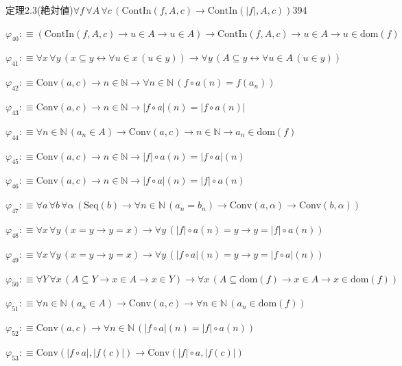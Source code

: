 \begin{fullproof}{定理2.3(絶対値)}{$\forall f\,\forall A\,\forall c\,(\mathrm{ContIn}(f,A,c) \to \mathrm{ContIn}(\lvert f \rvert,A,c))$}{394}
\begin{abbrevlist}
\item $\varphi_{40} :\equiv (\mathrm{ContIn}(f,A,c) \to u \in A \to u \in A) \to \mathrm{ContIn}(f,A,c) \to u \in A \to u \in \mathrm{dom}(f)$
\item $\varphi_{41} :\equiv \forall x\,\forall y\,(x \subseteq y \leftrightarrow \forall u \in x\,(u \in y)) \to \forall y\,(A \subseteq y \leftrightarrow \forall u \in A\,(u \in y))$
\item $\varphi_{42} :\equiv \mathrm{Conv}(a,c) \to n \in \mathbb{N} \to \forall n \in \mathbb{N}\,(f \circ a(n) = f(a_{n}))$
\item $\varphi_{43} :\equiv \mathrm{Conv}(a,c) \to n \in \mathbb{N} \to \lvert f \circ a \rvert(n) = \lvert f \circ a(n) \rvert$
\item $\varphi_{44} :\equiv \forall n \in \mathbb{N}\,(a_{n} \in A) \to \mathrm{Conv}(a,c) \to n \in \mathbb{N} \to a_{n} \in \mathrm{dom}(f)$
\item $\varphi_{45} :\equiv \mathrm{Conv}(a,c) \to n \in \mathbb{N} \to \lvert f \rvert \circ a(n) = \lvert f \circ a \rvert(n)$
\item $\varphi_{46} :\equiv \mathrm{Conv}(a,c) \to n \in \mathbb{N} \to \lvert f \circ a \rvert(n) = \lvert f \rvert \circ a(n)$
\item $\varphi_{47} :\equiv \forall a\,\forall b\,\forall \alpha\,(\mathrm{Seq}(b) \to \forall n \in \mathbb{N}\,(a_{n} = b_{n}) \to \mathrm{Conv}(a,\alpha) \to \mathrm{Conv}(b,\alpha))$
\item $\varphi_{48} :\equiv \forall x\,\forall y\,(x = y \to y = x) \to \forall y\,(\lvert f \rvert \circ a(n) = y \to y = \lvert f \rvert \circ a(n))$
\item $\varphi_{49} :\equiv \forall x\,\forall y\,(x = y \to y = x) \to \forall y\,(\lvert f \circ a \rvert(n) = y \to y = \lvert f \circ a \rvert(n))$
\item $\varphi_{50} :\equiv \forall Y\,\forall x\,(A \subseteq Y \to x \in A \to x \in Y) \to \forall x\,(A \subseteq \mathrm{dom}(f) \to x \in A \to x \in \mathrm{dom}(f))$
\item $\varphi_{51} :\equiv \forall n \in \mathbb{N}\,(a_{n} \in A) \to \mathrm{Conv}(a,c) \to \forall n \in \mathbb{N}\,(a_{n} \in \mathrm{dom}(f))$
\item $\varphi_{52} :\equiv \mathrm{Conv}(a,c) \to \forall n \in \mathbb{N}\,(\lvert f \circ a \rvert(n) = \lvert f \rvert \circ a(n))$
\item $\varphi_{53} :\equiv \mathrm{Conv}(\lvert f \circ a \rvert,\lvert f(c) \rvert) \to \mathrm{Conv}(\lvert f \rvert \circ a,\lvert f(c) \rvert)$

\end{abbrevlist}
\end{fullproof}
